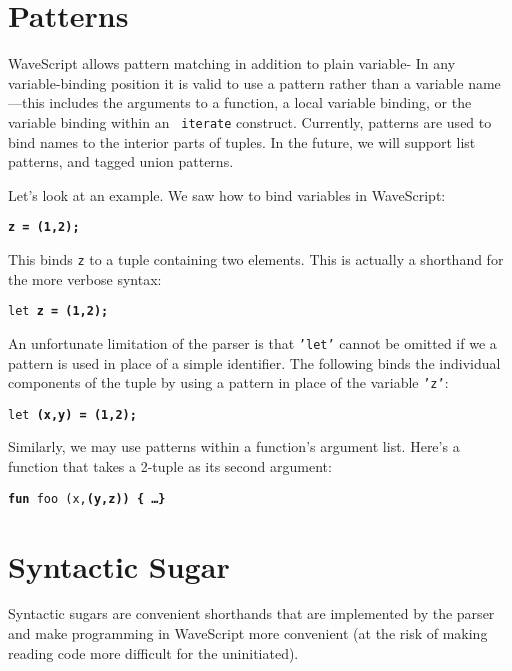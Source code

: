 \documentclass[twocolumn]{report}
\begin{document}
\section{Patterns}
\label{s:patterns}

WaveScript allows pattern matching in addition to plain variable-
In any variable-binding position it is valid to use a pattern rather
than a variable name---this includes the arguments to a function, a
local variable binding, or the variable binding within an {\tt
 iterate} construct.  Currently, patterns are used to bind names
to the interior parts of tuples.  In the future, we will support list
patterns, and tagged union patterns.  

Let's look at an example.
We saw how to bind variables in WaveScript:
\begin{center}
{\tt \bf{z} = (1,2);}
\end{center}
This binds {\tt z} to a tuple containing two elements.  
This is actually a shorthand for the more verbose syntax:
\begin{center}
{\tt let \bf{z} = (1,2);}
\end{center}

An unfortunate limitation of the parser is that {\tt 'let'} cannot be
omitted if we a pattern is used in place of a simple identifier.  The
following binds the individual components of the tuple by using a
pattern in place of the variable {\tt 'z'}:
\begin{center}
{\tt let \bf{(x,y)} = (1,2);}
\end{center}

Similarly, we may use patterns within a function's argument list.  Here's
a function that takes a 2-tuple as its second argument:

\begin{center}
{\tt {\bf fun} foo (x,\bf{(y,z)}) \{ \dots \}}
\end{center}


\section{Syntactic Sugar}

Syntactic sugars are convenient shorthands that are implemented by the
parser and make programming in WaveScript more convenient (at the risk
of making reading code more difficult for the uninitiated).
\end{document}
